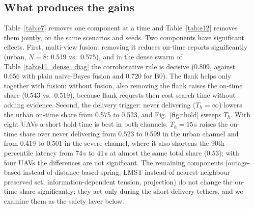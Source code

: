 \subsection{What produces the gains}\label{sec:eval:ablation}
Table~\ref{tab:e7} removes one component at a time and Table~\ref{tab:e12} removes them jointly, on
the same scenarios and seeds. Two components have significant effects. First, multi-view fusion:
removing it reduces on-time reports significantly (urban, $N=8$: 0.519 vs.\ 0.575), and in the dense
swarm of Table~\ref{tab:e11_dense_diag} the corroborative rule is decisive (0.809, against 0.656 with
plain naive-Bayes fusion and 0.720 for B0). The flank helps only together with fusion: without
fusion, also removing the flank raises the on-time share (0.543 vs.\ 0.519), because flank requests
then cost search time without adding evidence. Second, the delivery trigger: never delivering
($T_h=\infty$) lowers the urban on-time share from 0.575 to 0.523, and Fig.~\ref{fig:thold} sweeps
$T_h$. With eight UAVs a short hold time is best in both channels: $T_h=15$\,s raises the on-time
share over never delivering from 0.523 to 0.599 in the urban channel and from 0.419 to 0.501 in the
severe channel, where it also shortens the 90th-percentile latency from 74\,s to 41\,s at almost the
same total share (0.53); with four UAVs the differences are not significant. The remaining components
(outage-based instead of distance-based spring, LMST instead of nearest-neighbour preserved set,
information-dependent tension, projection) do not change the on-time share significantly; they act
only during the short delivery tethers, and we examine them as the safety layer below.

